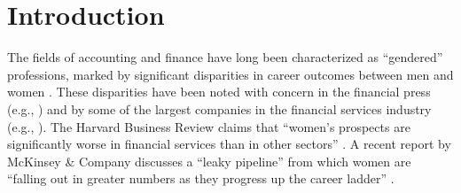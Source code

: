 \documentclass[11pt]{article}
\begin{document}
\newpage
{}
\normalsize
\doublespacing

\section{Introduction} \label{section:Intro}
    The fields of accounting and finance have long been characterized as ``gendered'' professions, marked by significant disparities in career outcomes between men and women \parencite{daltonWomenManagersPartners1997}. These disparities have been noted with concern in the financial press (e.g., \cite{rapoportWomenRarelyRun2018,jaekelWhyWomenArent2016}) and by some of the largest companies in the financial services industry (e.g., \cite{deloitteLeadershipRepresentationGender2022}). The Harvard Business Review claims that ``women's prospects are significantly worse in financial services than in other sectors'' \parencite{jaekelWhyWomenArent2016}. A recent report by McKinsey \& Company discusses a ``leaky pipeline'' from which women are ``falling out in greater numbers as they progress up the career ladder''  \parencite{ellingrudkweilinClosingGenderRace2021}. 
    
\end{document}
